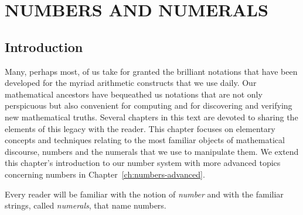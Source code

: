 
\chapter{NUMBERS AND NUMERALS}
\label{ch:numbers-numerals}

\section{Introduction}

Many, perhaps most, of us take for granted the brilliant notations
that have been developed for the myriad arithmetic constructs that we
use daily.  Our mathematical ancestors have bequeathed us notations
that are not only perspicuous but also convenient for computing and
for discovering and verifying new mathematical truths.  Several
chapters in this text are devoted to sharing the elements of this
legacy with the reader.  This chapter focuses on elementary concepts
and techniques relating to the most familiar objects of mathematical
discourse, numbers and the numerals that we use to manipulate them.
We extend this chapter's introduction to our number system with more
advanced topics concerning numbers in
Chapter~\ref{ch:numbers-advanced}.

Every reader will be familiar with the notion of {\it number} and with
the familiar strings, called {\it numerals}, that name numbers.
\medskip

\bigskip

